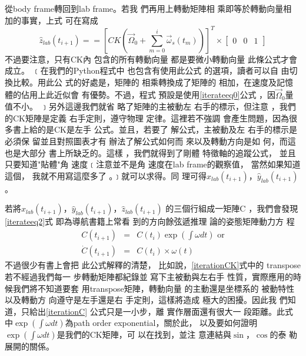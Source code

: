 \documentclass[12pt,twoside]{article}
\begin{document}
從body frame轉回到lab frame。若我%
們再用上轉動矩陣相%
乘即等於轉動向量相%
加的事實\cite{goldstein}，上式%
可在寫成%
\begin{equation}
\hat{z}_{lab}\left( t_{i+1}\right) ==\left[ CK\left( \vec{\Omega}%
_{0}+\sum\limits_{m=0}^{i}\vec{\omega}_{s}\left( t_{m}\right) \right) \right]
^{T}\times \left[ 
\begin{array}{ccc}
0 & 0 & 1%
\end{array}%
\right]  \label{iterateeq2}
\end{equation}%
不過要注意，只有CK內%
包含的所有轉動向量%
都是要微小轉動向量%
此條公式才會成立。%
﹝在我們的Python程式中%
也包含有使用此公式%
的選項，讀者可以自%
由切換比較。用此公%
式的好處是，矩陣的%
相乘轉換成了矩陣的%
相加，在速度及記憶%
體的佔用上此近似會%
有優勢。不過，程式%
預設是使用\ref{iterateeq0}公式%
，因$\vec{\Omega}_{0}$量值不小。%
﹞另外這邊我們就省%
略了矩陣的主被動左%
右手的標示，但注意%
，我們的CK矩陣是定義%
右手定則，遵守物理%
定律。這裡若不強調%
會產生問題，因為很%
多書上給的是CK是左手%
公式。並且，若要了%
解公式，主被動及左%
右手的標示是必須保%
留並且對照圖表才有%
辦法了解公式如何而%
來以及轉動方向是如%
何，而這也是大部分%
書上所缺乏的。這樣%
，我們就得到了剛體%
特徵軸的追蹤公式，%
並且只要知道"貼體"角%
速度﹝注意並不是角%
速度在lab frame的觀察值，%
當然如果知道這個，%
我就不用寫這麼多了%
。﹞就可以求得。同%
理可得$\hat{x}_{lab}\left( t_{i+1}\right) $，$\hat{y}%
_{lab}\left( t_{i+1}\right) $。

\bigskip 若將$\hat{x}_{lab}\left( t_{i+1}\right) $，$\hat{y%
}_{lab}\left( t_{i+1}\right) $，$\hat{z}_{lab}\left( t_{i+1}\right) $%
的三個行組成一矩陣C%
，我們會發現\ref{iterateeq2}式%
即為導航書籍上常看%
到的方向餘弦遞推理%
論的姿態矩陣動力方%
程\cite{titterton}%
\begin{eqnarray}
C(t_{i+1}) &=&C(t_{i})\exp (\int \omega dt)\text{ or}  \label{iterationC} \\
\dot{C}(t_{i+1}) &=&C(t_{i})\times \omega (t)
\end{eqnarray}%
不過很少有書上會把%
此公式解釋的清楚，%
比如說，\ref{iterationCK}式中的%
transpose若不經過我們每一%
步轉動矩陣都紀錄並%
寫下主被動與左右手%
性質，實際應用的時%
候我們將不知道要套%
用transpose矩陣，轉動向量%
的主動還是坐標系的%
被動特性以及轉動方%
向遵守是左手還是右%
手定則，這樣將造成%
極大的困擾。因此我%
們知道，只給出\ref{iterationC}%
公式只是一小步，離%
實作層面還有很大一%
段距離。此式中$\exp (\int \omega
dt)$為path order exponential，關於此，%
以及要如何證明$\exp (\int \omega
dt)$是我們的CK矩陣，可%
以在\cite[Page 49]{tong}找到，並注%
意連結與$\sin $，$\cos $的泰%
勒展開的關係。
\end{document}
